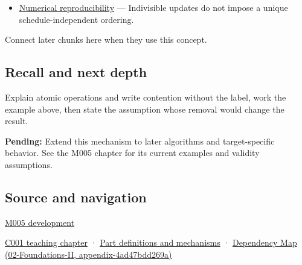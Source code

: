 \begin{itemize}
\tightlist
\item
  \hyperref[appendix-5f1a2c3f97ff]{Numerical reproducibility} --- Indivisible updates do not impose a unique schedule-independent ordering.
\end{itemize}

Connect later chunks here when they use this concept.

\subsection{Recall and next depth}\label{recall-and-next-depth}

Explain atomic operations and write contention without the label, work the example above, then state the assumption whose removal would change the result.

\textbf{Pending:} Extend this mechanism to later algorithms and target-specific behavior. See the M005 chapter for its current examples and validity assumptions.

\subsection{Source and navigation}\label{source-and-navigation}

\href{Continuous\%20Notes/Computing\%20Foundations\%20-\%20From\%20Bits\%20to\%20C++\%20and\%20Systems\%20APIs\#When\%20arithmetic\%20meets\%20uncertainty}{M005 development}

\href{Continuous\%20Notes/Computing\%20Foundations\%20-\%20From\%20Bits\%20to\%20C++\%20and\%20Systems\%20APIs\#From\%20a\%20signal\%20to\%20an\%20interpretation}{C001 teaching chapter} · \hyperref[appendix-fd090d982a15]{Part definitions and mechanisms} · \href{}{Dependency Map (02-Foundations-II, appendix-4ad47bdd269a)}
